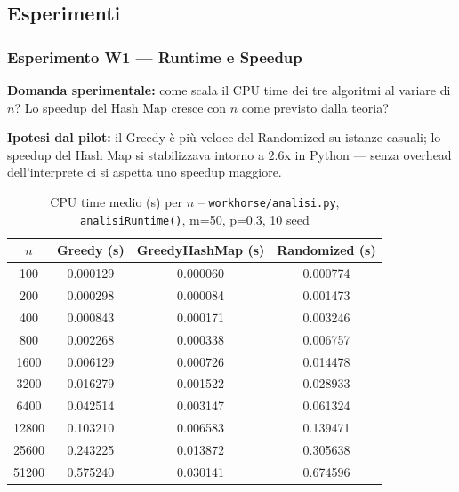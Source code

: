 \documentclass[12pt, a4paper]{article}
\begin{document}
\subsection{Esperimenti}

\subsubsection{Esperimento W1 — Runtime e Speedup}

\textbf{Domanda sperimentale:} come scala il CPU time dei tre algoritmi 
al variare di $n$? Lo speedup del Hash Map cresce con $n$ 
come previsto dalla teoria?

\textbf{Ipotesi dal pilot:} il Greedy \`e pi\`u veloce del Randomized 
su istanze casuali; lo speedup del Hash Map si stabilizzava intorno 
a $2.6$x in Python — senza overhead dell'interprete ci si aspetta 
uno speedup maggiore.

\begin{table}[H]
\centering
\caption{CPU time medio (s) per $n$ -- 
\texttt{workhorse/analisi.py}, \texttt{analisiRuntime()}, m=50, p=0.3, 10 seed}
\label{tab:wh_runtime}
\begin{tabular}{cccc}
\toprule
$n$ & Greedy (s) & GreedyHashMap (s) & Randomized (s) \\
\midrule
100    & 0.000129 & 0.000060 & 0.000774 \\
200    & 0.000298 & 0.000084 & 0.001473 \\
400    & 0.000843 & 0.000171 & 0.003246 \\
800    & 0.002268 & 0.000338 & 0.006757 \\
1600   & 0.006129 & 0.000726 & 0.014478 \\
3200   & 0.016279 & 0.001522 & 0.028933 \\
6400   & 0.042514 & 0.003147 & 0.061324 \\
12800  & 0.103210 & 0.006583 & 0.139471 \\
25600  & 0.243225 & 0.013872 & 0.305638 \\
51200  & 0.575240 & 0.030141 & 0.674596 \\
\bottomrule
\end{tabular}
\end{table}
\end{document}
